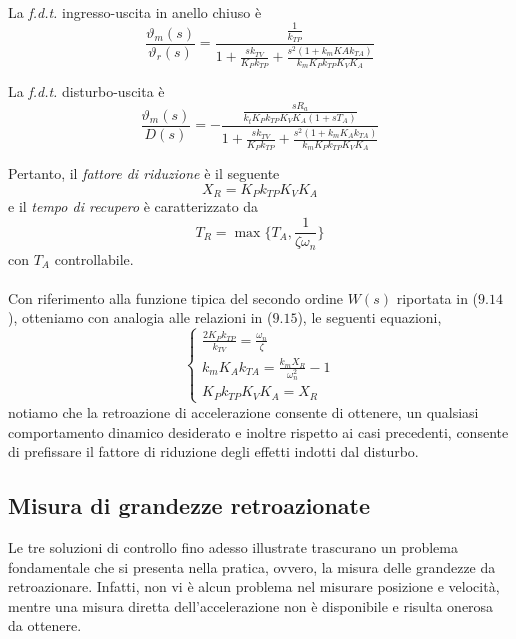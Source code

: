 \paragraph{}
La \emph{f.d.t.} ingresso-uscita in anello chiuso è
\begin{equation}
	\frac{\vartheta_m(s)}{\vartheta_r(s)} = \frac{\frac{1}{k_{TP}}}{1+\frac{sk_{TV}}{K_Pk_{TP}}+\frac{s^2(1+k_mKAk_{TA})}{k_mK_Pk_{TP}K_VK_A}}
\end{equation}

La \emph{f.d.t.} disturbo-uscita è
\begin{equation}
	\frac{\vartheta_m(s)}{D(s)} = -\frac{\frac{s R_a}{k_tK_Pk_{TP}K_VK_A(1+sT_A)}}{1+\frac{sk_{TV}}{K_Pk_{TP}}+\frac{s^2(1+k_mK_Ak_{TA})}{k_mK_Pk_{TP}K_VK_A}}
\end{equation}

Pertanto, il \emph{fattore di riduzione} è il seguente
\begin{equation}
	X_R = K_Pk_{TP}K_VK_A
\end{equation}
e il \emph{tempo di recupero} è caratterizzato da
\begin{equation}
	T_R = \max \lbrace T_A, \frac{1}{\zeta \omega_n} \rbrace
\end{equation}
con $T_A$ controllabile.

\paragraph{}
Con riferimento alla funzione tipica del secondo ordine $W(s)$ riportata in ($9.14$), otteniamo con analogia alle relazioni in ($9.15$), le seguenti equazioni,
\begin{equation}
	\begin{cases}
		\frac{2K_Pk_{TP}}{k_{TV}} = \frac{\omega_n}{\zeta} \\
		k_mK_Ak_{TA} = \frac{k_mX_R}{\omega_n^2} - 1\\
		K_Pk_{TP}K_VK_A = X_R
	\end{cases}
\end{equation}
notiamo che la retroazione di accelerazione consente di ottenere, un qualsiasi comportamento dinamico desiderato e inoltre rispetto ai casi precedenti, consente di prefissare il fattore di riduzione degli effetti indotti dal disturbo.

\newpage

\subsection{Misura di grandezze retroazionate} 
Le tre soluzioni di controllo fino adesso illustrate trascurano un problema fondamentale che si presenta nella pratica, ovvero, la misura delle grandezze da retroazionare. Infatti, non vi è alcun problema nel misurare posizione e velocità, mentre una misura diretta dell'accelerazione non è disponibile e risulta onerosa da ottenere. 

